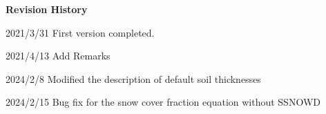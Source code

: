 \textbf{Revision History}

2021/3/31 First version completed.

2021/4/13 Add Remarks

2024/2/8 Modified the description of default soil thicknesses

2024/2/15 Bug fix for the snow cover fraction equation without SSNOWD
